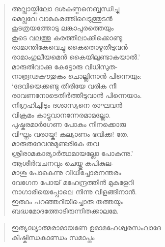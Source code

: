 \begin{verse}
അല്ലായ്കിലോ ദശകണ്ഠനെബ്ബന്ധിച്ചു\\
മെല്ലവേ വാമകരത്തിലെടുത്തുടന്‍\\
കൂടത്രയത്തോടു ലങ്കാപുരത്തെയും\\
കൂടെ വലത്തു കരത്തിലാക്കിക്കൊണ്ടു\\
രാമാന്തികേവെച്ചു കൈതൊഴുതീടുവന്‍\\
രാമാംഗുലീയമെന്‍ കൈയിലുണ്ടാകയാല്‍.’\\
മാരുതിവാക്കു കേട്ടോരു വിധിസുത-\\
നാരൂഢകൗതുകം ചൊല്ലിനാന്‍ പിന്നെയും:\\
‘ദേവിയെക്കണ്ടു തിരിയേ വരിക നീ\\
രാവണനോടെതിര്‍ത്തീടുവാന്‍ പിന്നെയാം.\\
നിഗ്രഹിച്ചീടും ദശാസ്യനെ രാഘവന്‍\\
വിക്രമം കാട്ടുവാനന്നേരമാമല്ലോ.\\
പുഷ്കരമാര്‍ഗേണ പോകും നിനക്കൊരു\\
വിഘ്നം വരായ്ക! കല്യാണം ഭവിക്ക! തേ.\\
മാരുതദേവനുമുണ്ടരികേ തവ\\
ശ്രീരാമകാര്യാര്‍ത്ഥമായല്ലോ പോകുന്നു.’\\
ആശീര്‍വചനവും ചെയ്തു കപികുല-\\
മാശു പോകെന്നു വിധിച്ചോരനന്തരം\\
വേഗേന പോയ് മഹേന്ദ്രത്തിന്‍ മുകളേറി\\
നാഗാരിയെപ്പോലെ നിന്നു വിളങ്ങിനാന്‍.\\
ഇത്ഥം പറഞ്ഞറിയിച്ചൊരു തത്തയും\\
ബദ്ധമോദത്തോടിരുന്നിതക്കാലമേ.
\end{verse}

\begin{verse}
ഇത്യദ്ധ്യാത്മരാമായണേ ഉമാമഹേശ്വരസംവാദേ\\
കിഷ്കിന്ധകാണ്ഡം സമാപ്തം
\end{verse}




